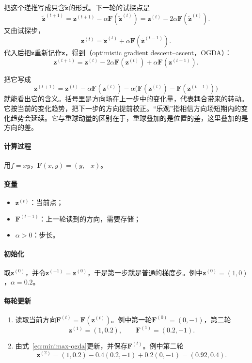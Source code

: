 把这个递推写成只含$\tilde{\bm{z}}$的形式。下一轮的试探点是
\[
 \tilde{\bm{z}}^{(t+1)}=\bm{z}^{(t+1)}-\alpha\bm{F}(\tilde{\bm{z}}^{(t)})=\bm{z}^{(t)}-2\alpha\bm{F}(\tilde{\bm{z}}^{(t)}).
\]
又由试探步，
\[
 \bm{z}^{(t)}=\tilde{\bm{z}}^{(t)}+\alpha\bm{F}(\tilde{\bm{z}}^{(t-1)}).
\]
代入后把$\tilde{\bm{z}}$重新记作$\bm{z}$，得到（optimistic gradient descent--ascent，OGDA）：
\begin{equation}
 \bm{z}^{(t+1)}=\bm{z}^{(t)}-2\alpha\bm{F}(\bm{z}^{(t)})+\alpha\bm{F}(\bm{z}^{(t-1)}).
 \label{eq:minimax-ogda}
\end{equation}

把它写成
\[
 \bm{z}^{(t+1)}=\bm{z}^{(t)}-\alpha\bm{F}(\bm{z}^{(t)})-\alpha\bigl(\bm{F}(\bm{z}^{(t)})-\bm{F}(\bm{z}^{(t-1)})\bigr)
\]
就能看出它的含义。括号里是方向场在上一步中的变化量，代表耦合带来的转动。它按当前的变化趋势，把下一步的方向提前校正。“乐观”指相信方向场短期内的变化趋势会延续。它与重球动量的区别在于，重球叠加的是位置的差，这里叠加的是方向的差。

\paragraph{计算过程}
用$f=xy$，$\bm{F}(x,y)=(y,-x)$。

\paragraph{变量}
\begin{itemize}
 \item $\bm{z}^{(t)}$：当前点；
 \item $\bm{F}^{(t-1)}$：上一轮读到的方向，需要存储；
 \item $\alpha>0$：步长。
\end{itemize}

\paragraph{初始化}
取$\bm{z}^{(0)}$，并令$\bm{z}^{(-1)}=\bm{z}^{(0)}$，于是第一步就是普通的梯度步。例中$\bm{z}^{(0)}=(1,0)$，$\alpha=0.2$。

\paragraph{每轮更新}
\begin{enumerate}
 \item 读取当前方向$\bm{F}^{(t)}=\bm{F}(\bm{z}^{(t)})$。例中第一轮$\bm{F}^{(0)}=(0,-1)$，第二轮
 \[
  \bm{z}^{(1)}=(1,0.2),\qquad\bm{F}^{(1)}=(0.2,-1).
 \]
 \item 由式~\eqref{eq:minimax-ogda}更新，并保存$\bm{F}^{(t)}$。例中第二轮
 \[
  \bm{z}^{(2)}=(1,0.2)-0.4(0.2,-1)+0.2(0,-1)=(0.92,0.4).
 \]
\end{enumerate}

